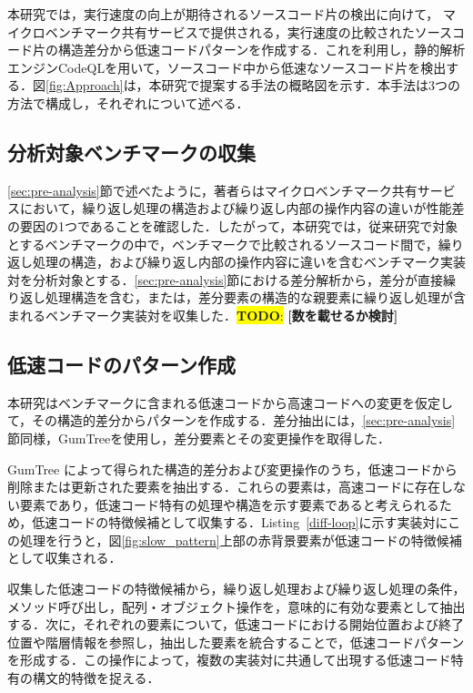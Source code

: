 \documentclass[submit,techrep,noauthor]{ipsj}
\newcommand{\todo}[1]{\colorbox{yellow}{{\bf TODO}:}{\color{red} {\textbf{[#1]}}}}
\begin{document}
本研究では，実行速度の向上が期待されるソースコード片の検出に向けて，
マイクロベンチマーク共有サービスで提供される，実行速度の比較されたソースコード片の構造差分から低速コードパターンを作成する．これを利用し，静的解析エンジンCodeQLを用いて，ソースコード中から低速なソースコード片を検出する．図\ref{fig:Approach}は，本研究で提案する手法の概略図を示す．本手法は3つの方法で構成し，それぞれについて述べる．


\subsection{分析対象ベンチマークの収集}

\ref{sec:pre-analysis}節で述べたように，著者らはマイクロベンチマーク共有サービスにおいて，繰り返し処理の構造および繰り返し内部の操作内容の違いが性能差の要因の1つであることを確認した．したがって，本研究では，従来研究で対象とするベンチマークの中で，ベンチマークで比較されるソースコード間で，繰り返し処理の構造，および繰り返し内部の操作内容に違いを含むベンチマーク実装対を分析対象とする．\ref{sec:pre-analysis}節における差分解析から，差分が直接繰り返し処理構造を含む，または，差分要素の構造的な親要素に繰り返し処理が含まれるベンチマーク実装対を収集した．\todo{数を載せるか検討}


\subsection{低速コードのパターン作成}
本研究はベンチマークに含まれる低速コードから高速コードへの変更を仮定して，その構造的差分からパターンを作成する．差分抽出には，\ref{sec:pre-analysis}節同様，GumTreeを使用し，差分要素とその変更操作を取得した．

GumTree によって得られた構造的差分および変更操作のうち，低速コードから削除または更新された要素を抽出する．これらの要素は，高速コードに存在しない要素であり，低速コード特有の処理や構造を示す要素であると考えられるため，低速コードの特徴候補として収集する．Listing~\ref{diff-loop}に示す実装対にこの処理を行うと，図\ref{fig:slow_pattern}上部の赤背景要素が低速コードの特徴候補として収集される．

収集した低速コードの特徴候補から，繰り返し処理および繰り返し処理の条件，メソッド呼び出し，配列・オブジェクト操作を，意味的に有効な要素として抽出する．次に，それぞれの要素について，低速コードにおける開始位置および終了位置や階層情報を参照し，抽出した要素を統合することで，低速コードパターンを形成する．この操作によって，複数の実装対に共通して出現する低速コード特有の構文的特徴を捉える．
\end{document}
